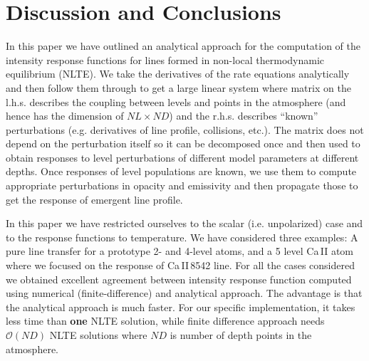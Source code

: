 \documentclass[referee]{aa}
\begin{document}

\section{Discussion and Conclusions}

In this paper we have outlined an analytical approach for the computation of the intensity response functions for lines formed in non-local thermodynamic equilibrium (NLTE). We take the derivatives of the rate equations analytically and then follow them through to get a large linear system where matrix on the l.h.s. describes the coupling between levels and points in the atmosphere (and hence has the dimension of $NL\times ND$) and the r.h.s. describes ``known'' perturbations (e.g. derivatives of line profile, collisions, etc.). The matrix does not depend on the perturbation itself so it can be decomposed once and then used to obtain responses to level perturbations of different model parameters at different depths. Once responses of level populations are known, we use them to compute appropriate perturbations in opacity and emissivity and then propagate those to get the response of emergent line profile. 

In this paper we have restricted ourselves to the scalar (i.e. unpolarized) case and to the response functions to temperature. We have considered three examples: A pure line transfer for a prototype 2- and 4-level atoms, and a 5 level Ca\,II atom where we focused on the response of Ca\,II\,8542 line. For all the cases considered we obtained excellent agreement between intensity response function computed using numerical (finite-difference) and analytical approach. The advantage is that the analytical approach is much faster. For our specific implementation, it takes less time than \textbf{one} NLTE solution, while finite difference approach needs  ${\mathcal O}(ND)$ NLTE solutions where $ND$ is number of depth points in the atmosphere. 
\end{document}
